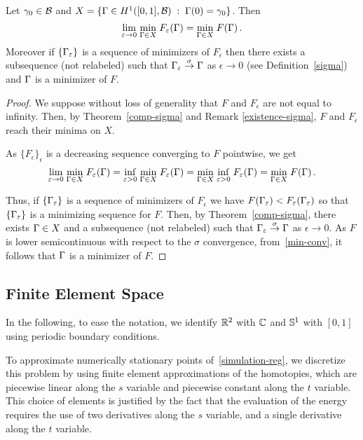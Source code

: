 \begin{thm}\label{thm-gamma-cv}
	Let $\gamma_0\in \mathcal{B}$  and  $X= \{ \Gamma\in H^1([0,1],\mathcal{B})\;:\; \Gamma(0)=\gamma_0\}$.
 Then 
$$
	\underset{\varepsilon\rightarrow 0}{\lim} \; \underset{\Gamma\in X}{\min}\; F_\varepsilon(\Gamma) =  \underset{\Gamma\in X}{\min}\; F(\Gamma) \,.
$$
Moreover if $\{\Gamma_\varepsilon\}$ is a sequence of minimizers of $F_\epsilon$ then there exists a subsequence (not relabeled) such that $\Gamma_\varepsilon\overset{\sigma}{\rightarrow}\Gamma$ as $\epsilon\rightarrow 0$ (see Definition~\ref{sigma}) and $\Gamma$ is a minimizer of $F$.
\end{thm}

\begin{proof} We suppose without loss of generality  that $F$ and $F_\epsilon$ are not equal to infinity. 
Then, by  Theorem~\ref{comp-sigma} and Remark \ref{existence-sigma},  $F$ and $F_\epsilon$ reach their minima on $X$.

As $\{F_\epsilon\}_\epsilon$ is a decreasing sequence converging to $F$ pointwise, we get 
\begin{equation}\label{min-conv}
\underset{\varepsilon\rightarrow 0}{\lim} \; \underset{\Gamma\in X}{\min}\;F_\varepsilon(\Gamma) = \underset{\varepsilon>0}{\inf}\; \underset{\Gamma\in X}{\min}\; F_\varepsilon(\Gamma) =  \underset{\Gamma\in X}{\min}\; \underset{\varepsilon>0}{\inf}\; F_\varepsilon(\Gamma) =  \underset{\Gamma\in X}{\min}\; F(\Gamma) \,.
\end{equation}

Thus, if $\{\Gamma_\varepsilon\}$ is a sequence of minimizers of $F_\epsilon$ we have $F(\Gamma_\varepsilon)< F_\varepsilon(\Gamma_\varepsilon)$ so that $\{\Gamma_\varepsilon\}$ is a minimizing sequence for $F$.  Then, by Theorem~\ref{comp-sigma}, there exists $\Gamma\in X$ and  a subsequence (not relabeled) such that $\Gamma_\varepsilon\overset{\sigma}{\rightarrow}\Gamma$ as $\epsilon\rightarrow 0$. As $F$ is lower semicontinuous with respect to the $\sigma$ convergence, from~\eqref{min-conv},  it follows that $\Gamma$ is a minimizer of $F$.
\end{proof}


\subsection{Finite Element Space}
\label{sec-finite-elements}

In the following, to ease the notation, we identify $\mathbb{R}^2$ with $\mathbb{C}$ and $\mathbb{S}^1$ with $[0,1]$ using periodic boundary conditions.  

To approximate numerically stationary points of~\eqref{simulation-reg}, we discretize this problem by using finite element approximations of the homotopies, which are piecewise linear along the $s$ variable and piecewise constant along the $t$ variable. This choice of elements is justified by the fact that the evaluation of the energy requires the use of two derivatives along the $s$ variable, and a single derivative along the $t$ variable. 

